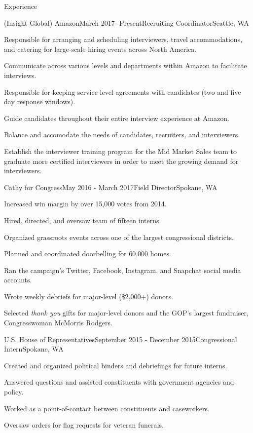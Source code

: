 \documentclass{resume} %
\begin{document}
\begin{rSection}{Experience}

\begin{rSubsection}{(Insight Global) Amazon}{March 2017- Present}{Recruiting Coordinator}{Seattle, WA}
\item Responsible for arranging and scheduling interviewers, travel accommodations, and catering for large-scale hiring events across North America. 
\item Communicate across various levels and departments within Amazon to facilitate interviews.
\item Responsible for keeping service level agreements with candidates (two and five day response windows).
\item Guide candidates throughout their entire interview experience at Amazon.
\item Balance and accomodate the needs of candidates, recruiters, and interviewers.
\item Establish the interviewer training program for the Mid Market Sales team to graduate more certified interviewers in order to meet the growing demand for interviewers.
\end{rSubsection}
	

\begin{rSubsection}{Cathy for Congress}{May 2016 - March 2017}{Field Director}{Spokane, WA}
\item Increased win margin by over 15,000 votes from 2014.
\item Hired, directed, and oversaw team of fifteen interns.
\item Organized grassroots events across one of the largest congressional districts.
\item Planned and coordinated doorbelling for 60,000 homes.
\item Ran the campaign's Twitter, Facebook, Instagram, and Snapchat social media accounts.
\item Wrote weekly debriefs for major-level (\$2,000+) donors.
\item Selected \textit{thank you} gifts for major-level donors and the GOP's largest fundraiser, Congresswoman McMorris Rodgers.
\end{rSubsection}


\begin{rSubsection}{U.S. House of Representatives}{September 2015 - December 2015}{Congressional Intern}{Spokane, WA}
\item Created and organized political binders and debriefings for future interns.
\item Answered questions and assisted constituents with government agencies and policy.
\item Worked as a point-of-contact between constituents and caseworkers.
\item Oversaw orders for flag requests for veteran funerals.
\end{rSubsection}

\end{rSection}
\end{document}

